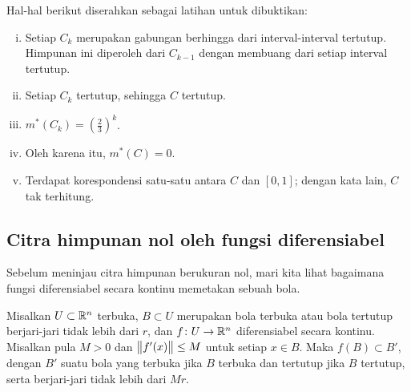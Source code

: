 \begin{example}
Hal-hal berikut diserahkan sebagai latihan untuk dibuktikan:
\begin{enumerate}[(i)]
\item Setiap $C_k$ merupakan gabungan berhingga dari interval-interval tertutup.
Himpunan ini diperoleh dari $C_{k-1}$ dengan membuang
 dari setiap interval tertutup.
\item Setiap $C_k$ tertutup, sehingga $C$ tertutup.
\item 
$m^*(C_k) = {\left(\frac{2}{3}\right)}^k$.
\item Oleh karena itu,
$m^*(C) = 0$.
\item Terdapat korespondensi satu-satu antara $C$ dan $[0,1]$; dengan kata lain,
$C$ tak terhitung.
\end{enumerate}
\begin{myfigureht}
\caption{Konstruksi himpunan Cantor.\label{fig:cantor}}
\end{myfigureht}
\end{example}


\subsection{Citra himpunan nol oleh fungsi diferensiabel}

Sebelum meninjau citra himpunan berukuran nol, mari kita lihat bagaimana fungsi
diferensiabel secara kontinu memetakan sebuah bola.

\begin{lemma} \label{lemma:ballmapder}
Misalkan $U\subset{\mathbb{R}}^n$ terbuka, $B\subset U$ merupakan bola terbuka atau bola
tertutup berjari-jari tidak lebih dari $r$, dan
$f\colon U\to{\mathbb{R}}^n$ diferensiabel secara kontinu. Misalkan pula $M>0$ dan
$\bigl\lVert {f'(x)} \bigr\rVert\leq M$ untuk setiap $x\in B$. Maka $f(B)\subset B'$, dengan
$B'$ suatu bola yang terbuka jika $B$ terbuka dan tertutup jika $B$ tertutup,
serta berjari-jari tidak lebih dari $Mr$.
\end{lemma}

